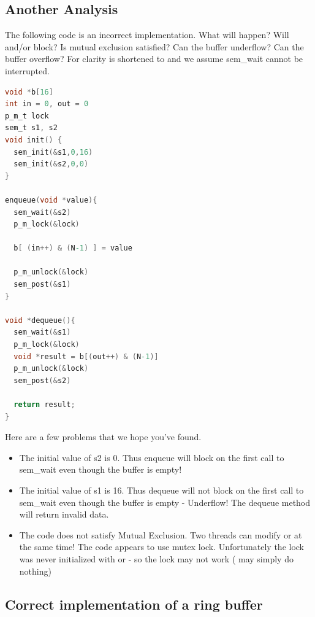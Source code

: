 \subsection{Another Analysis}

The following code is an incorrect implementation.
What will happen?
Will  and/or  block?
Is mutual exclusion satisfied?
Can the buffer underflow?
Can the buffer overflow?
For clarity  is shortened to  and we assume sem\_wait cannot be interrupted.

\begin{lstlisting}[language=C]
void *b[16]
int in = 0, out = 0
p_m_t lock
sem_t s1, s2
void init() {
  sem_init(&s1,0,16)
  sem_init(&s2,0,0)
}

enqueue(void *value){
  sem_wait(&s2)
  p_m_lock(&lock)

  b[ (in++) & (N-1) ] = value

  p_m_unlock(&lock)
  sem_post(&s1)
}

void *dequeue(){
  sem_wait(&s1)
  p_m_lock(&lock)
  void *result = b[(out++) & (N-1)]
  p_m_unlock(&lock)
  sem_post(&s2)

  return result;
}
\end{lstlisting}

Here are a few problems that we hope you've found.

\begin{itemize}
\tightlist
\item
  The initial value of s2 is 0.
  Thus enqueue will block on the first call to sem\_wait even though the buffer is empty!
\item
  The initial value of s1 is 16.
  Thus dequeue will not block on the first call to sem\_wait even though the buffer is empty - Underflow!
  The dequeue method will return invalid data.
\item
  The code does not satisfy Mutual Exclusion.
  Two threads can modify  or  at the same time!
  The code appears to use mutex lock. Unfortunately the lock was never initialized with  or  - so the lock may not work ( may simply do nothing)
\end{itemize}

\subsection{Correct implementation of a ring buffer}

